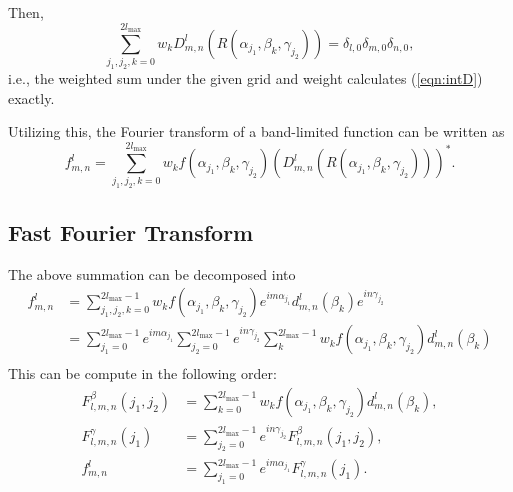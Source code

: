 \documentclass{ieeetran}
\newcommand{\refeqn}[1]{(\ref{eqn:#1})}
\begin{document}
Then, 
\[
\sum_{j_1,j_2,k=0}^{2l_{\max}} w_k D^l_{m,n}(R(\alpha_{j_1},\beta_k,\gamma_{j_2}))=\delta_{l,0}\delta_{m,0}\delta_{n,0},
\]
i.e., the weighted sum under the given grid and weight calculates \refeqn{intD} exactly. 

Utilizing this, the Fourier transform of a band-limited function can be written as
\[
f^l_{m,n}=\sum_{j_1,j_2,k=0}^{2l_{\max}} w_k f(\alpha_{j_1},\beta_k,\gamma_{j_2})
(D^l_{m,n}(R(\alpha_{j_1},\beta_k,\gamma_{j_2})))^*.
\]

\subsection{Fast Fourier Transform}
The above summation can be decomposed into
\begin{align*}
f^l_{m,n}&=\sum_{j_1,j_2,k=0}^{2l_{\max}-1} w_k f(\alpha_{j_1},\beta_k,\gamma_{j_2})
e^{im\alpha_{j_1}} d^l_{m,n}(\beta_k) e^{in\gamma_{j_2}}\\
&=\sum_{j_1=0}^{2l_{\max}-1} 
e^{im\alpha_{j_1}}\sum_{j_2=0}^{2l_{\max}-1} e^{in\gamma_{j_2}} \sum_{k}^{2l_{\max}-1}w_k f(\alpha_{j_1},\beta_k,\gamma_{j_2})d^l_{m,n}(\beta_k) \\
\end{align*}
This can be compute in the following order:
\begin{align*}
F^{\beta}_{l,m,n}(j_1,j_2)&=\sum_{k=0}^{2l_{\max}-1}w_k f(\alpha_{j_1},\beta_k,\gamma_{j_2})d^l_{m,n}(\beta_k),\\
F^{\gamma}_{l,m,n}(j_1)&=\sum_{j_2=0}^{2l_{\max}-1}e^{in\gamma_{j_2}}F^{\beta}_{l,m,n}(j_1,j_2),\\
f^l_{m,n} & = \sum_{j_1=0}^{2l_{\max}-1} e^{im\alpha_{j_1}}F^{\gamma}_{l,m,n}(j_1).
\end{align*}



\end{document}
